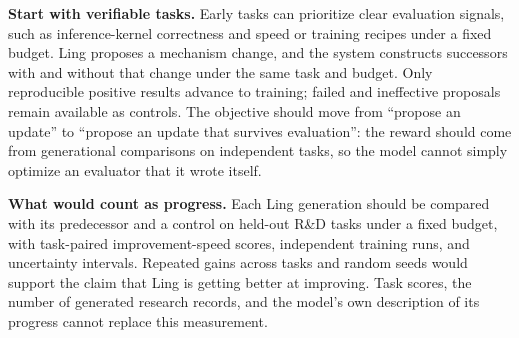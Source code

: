 \documentclass{article}
\begin{document}
\textbf{Start with verifiable tasks.} Early tasks can prioritize clear evaluation signals, such as inference-kernel correctness and speed or training recipes under a fixed budget. Ling proposes a mechanism change, and the system constructs successors with and without that change under the same task and budget. Only reproducible positive results advance to training; failed and ineffective proposals remain available as controls. The objective should move from ``propose an update'' to ``propose an update that survives evaluation'': the reward should come from generational comparisons on independent tasks, so the model cannot simply optimize an evaluator that it wrote itself.

\textbf{What would count as progress.} Each Ling generation should be compared with its predecessor and a control on held-out R\&D tasks under a fixed budget, with task-paired improvement-speed scores, independent training runs, and uncertainty intervals. Repeated gains across tasks and random seeds would support the claim that Ling is getting better at improving. Task scores, the number of generated research records, and the model's own description of its progress cannot replace this measurement.


\end{document}
